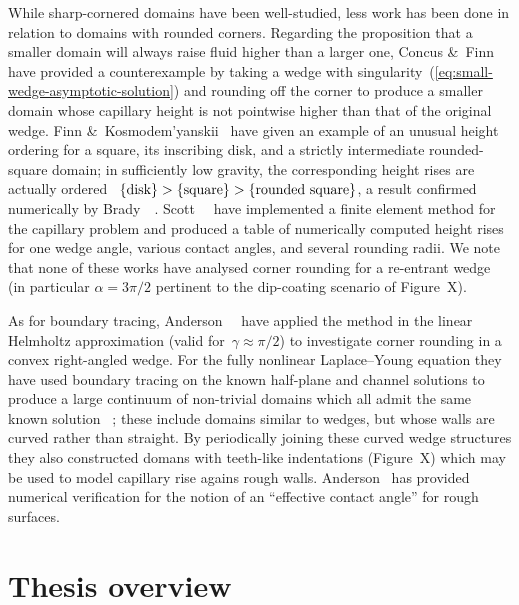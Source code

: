While sharp-cornered domains have been well-studied,
less work has been done in relation to domains with rounded corners.
Regarding the proposition that
a smaller domain will always raise fluid higher than a larger one,
Concus \&~Finn~\cite{concus-1976-height-capillary-surface}
have provided a counterexample
by taking a wedge with singularity~(\ref{eq:small-wedge-asymptotic-solution})
and rounding off the corner
to produce a smaller domain whose capillary height
is not pointwise higher than that of the original wedge.
Finn \&~Kosmodem'yanskii~%
  \cite{finn-2002-unusual-comparison-properties-capillary}
have given an example of an unusual height ordering
for a square, its inscribing disk,
and a strictly intermediate rounded-square domain;
in sufficiently low gravity,
the corresponding height rises are actually ordered~%
$\left\{\text{disk}\right\} > \left\{\text{square}\right\} > \left\{\text{rounded square}\right\}$,
a result confirmed numerically
by Brady~\etal~\cite{brady-2003-capillary-rise-nesting-cylinders}.
Scott~\etal~\cite{scott-2005-computation-capillary-laplace-young}
have implemented a finite element method for the capillary problem
and produced a table of numerically computed height rises
for one wedge angle, various contact angles, and several rounding radii.
We note that none of these works
have analysed corner rounding for a re-entrant wedge
(in particular $\alpha = 3\pi/2$ pertinent to the dip-coating scenario
of Figure~X). %

As for boundary tracing,
Anderson~\etal~\cite{anderson-2007-boundary-tracing-ii-applications}
have applied the method in the linear Helmholtz approximation
(valid for~$\gamma \approx \pi/2$)
to investigate corner rounding in a convex right-angled wedge.
For the fully nonlinear Laplace--Young equation
they have used boundary tracing
on the known half-plane and channel solutions
to produce a large continuum of non-trivial domains
which all admit the same known solution~%
  \cite{anderson-2006-exact-solutions-laplace-young};
these include domains similar to wedges,
but whose walls are curved rather than straight.
By periodically joining these curved wedge structures
they also constructed domans with teeth-like indentations
(Figure~X) %
which may be used to model capillary rise agains rough walls.
Anderson~\cite{anderson-2002-thesis-boundary-tracing-pdes}
has provided numerical verification
for the notion of an ``effective contact angle'' for rough surfaces.

\section{Thesis overview}
